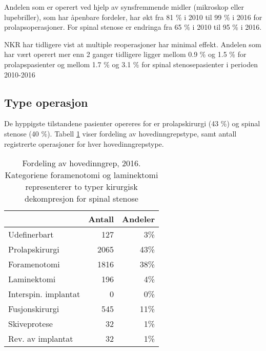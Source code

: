 Andelen som er operert ved hjelp av synsfremmende midler (mikroskop eller
lupebriller), som har åpenbare fordeler, har økt fra 81 \% i 2010 til 
99 \% i 2016 for prolapsoperasjoner. For spinal stenose er endringa fra 65 \% i 2010 til 95 \% i 2016.





NKR har tidligere vist at multiple reoperasjoner har minimal effekt. Andelen som har vært operert mer enn 2 ganger tidligere ligger mellom 0.9 \%
og 1.5 \% for prolapspasienter og mellom 1.7 \%
og 3.1 \% for spinal stenosepasienter i perioden 2010-2016
\subsection{Type operasjon}



De hyppigste tilstandene pasienter opereres for er prolapskirurgi (43 \%) og spinal stenose (40 \%). Tabell \ref{tab:AntHovedInngrep} viser fordeling av hovedinngrepstype, samt antall registrerte operasjoner for hver hovedinngrepstype.

\begin{table}[ht]
\centering
\begin{tabular}{lrr}
  \hline
 & Antall & Andeler \\ 
  \hline
Udefinerbart & 127 & 3\% \\ 
  Prolapskirurgi & 2065 & 43\% \\ 
  Foramenotomi & 1816 & 38\% \\ 
  Laminektomi & 196 & 4\% \\ 
  Interspin. implantat & 0 & 0\% \\ 
  Fusjonskirurgi & 545 & 11\% \\ 
  Skiveprotese & 32 & 1\% \\ 
  Rev. av implantat & 32 & 1\% \\ 
   \hline
\end{tabular}
\caption{Fordeling av hovedinngrep, 2016. Kategoriene foramenotomi og laminektomi representerer to typer kirurgisk dekompresjon for spinal stenose} 
\label{tab:AntHovedInngrep}
\end{table}






